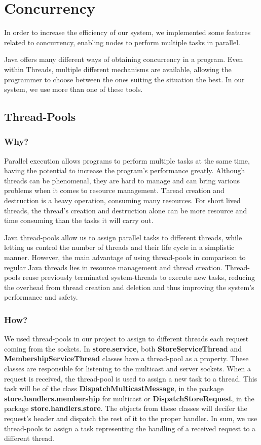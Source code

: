 \section{Concurrency}

In order to increase the efficiency of our system, we implemented some features related to concurrency, enabling nodes to perform multiple tasks in parallel.

Java offers many different ways of obtaining concurrency in a program. Even within Threads, multiple different mechanisms are available, allowing the programmer to choose between the ones suiting the situation the best. In our system, we use more than one of these tools.

\subsection{Thread-Pools}

\subsubsection{Why?}

Parallel execution allows programs to perform multiple tasks at the same time, having the potential to increase the program's performance greatly. Although threads can be phenomenal, they are hard to manage and can bring various problems when it comes to resource management. Thread creation and destruction is a heavy operation, consuming many resources. For short lived threads, the thread's creation and destruction alone can be more resource and time consuming than the tasks it will carry out.

Java thread-pools allow us to assign parallel tasks to different threads, while letting us control the number of threads and their life cycle in a simplistic manner. However, the main advantage of using thread-pools in comparison to regular Java threads lies in resource management and thread creation. Thread-pools reuse previously terminated system-threads to execute new tasks, reducing the overhead from thread creation and deletion and thus improving the system's performance and safety. 

\subsubsection{How?}

We used thread-pools in our project to assign to different threads each request coming from the sockets. In \textbf{store.service}, both \textbf{StoreServiceThread} and \textbf{MembershipServiceThread} classes have a thread-pool as a property. These classes are responsible for listening to the multicast and server sockets. When a request is received, the thread-pool is used to assign a new task to a thread. This task will be of the class \textbf{DispatchMulticastMessage}, in the package \textbf{store.handlers.membership} for multicast or \textbf{DispatchStoreRequest}, in the package \textbf{store.handlers.store}. The objects from these classes will decifer the request's header and dispatch the rest of it to the proper handler. In sum, we use thread-pools to assign a task representing the handling of a received request to a different thread.


